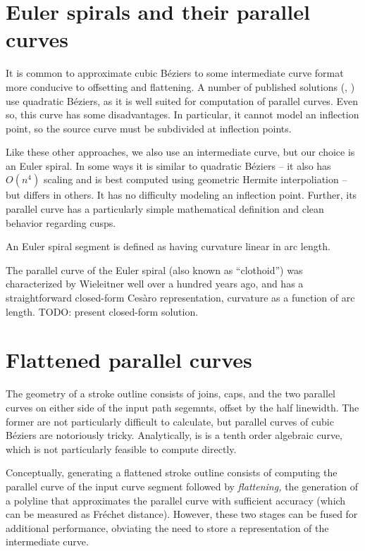 \documentclass[format=acmsmall]{acmart}
\begin{document}
\section{Euler spirals and their parallel curves}

It is common to approximate cubic Béziers to some intermediate curve format more conducive to offsetting and flattening. A number of published solutions (\cite{Yzerman2020}, \cite{Nehab2020}) use quadratic Béziers, as it is well suited for computation of parallel curves. Even so, this curve has some disadvantages. In particular, it cannot model an inflection point, so the source curve must be subdivided at inflection points.

Like these other approaches, we also use an intermediate curve, but our choice is an Euler spiral. In some ways it is similar to quadratic Béziers -- it also has $O(n^4)$ scaling and is best computed using geometric Hermite interpoliation -- but differs in others. It has no difficulty modeling an inflection point. Further, its parallel curve has a particularly simple mathematical definition and clean behavior regarding cusps.

An Euler spiral segment is defined as having curvature linear in arc length.

The parallel curve of the Euler spiral (also known as ``clothoid'') was characterized by Wieleitner well over a hundred years ago\cite{Wieleitner1907}, and has a straightforward closed-form Cesàro representation, curvature as a function of arc length. TODO: present closed-form solution.

\section{Flattened parallel curves}

The geometry of a stroke outline consists of joins, caps, and the two parallel curves on either side of the input path segemnts, offset by the half linewidth. The former are not particularly difficult to calculate, but parallel curves of cubic Béziers are notoriously tricky. Analytically, is is a tenth order algebraic curve, which is not particularly feasible to compute directly.

Conceptually, generating a flattened stroke outline consists of computing the parallel curve of the input curve segment followed by \emph{flattening,} the generation of a polyline that approximates the parallel curve with sufficient accuracy (which can be measured as Fréchet distance). However, these two stages can be fused for additional performance, obviating the need to store a representation of the intermediate curve.
\end{document}
